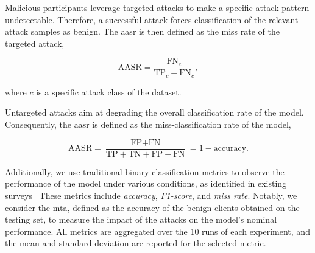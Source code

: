 \begin{description}[font=\normalfont\textit]
  \item[Targeted attacks:]
    Malicious participants leverage targeted attacks to make a specific attack pattern undetectable.
    Therefore, a successful attack forces classification of the relevant attack samples as benign.
    The \gls{aasr} is then defined as the miss rate of the targeted attack, \ie

    \begin{equation}
      \label{eq:aasr_targeted}
      \text{AASR} = \frac
        {\text{FN}_c}
        {\text{TP}_c + \text{FN}_c},
    \end{equation}

    where $c$ is a specific attack class of the dataset.

  \item[Untargeted Attacks:]
    Untargeted attacks aim at degrading the overall classification rate of the model.
    Consequently, the \gls{aasr} is defined as the miss-classification rate of the model, \ie

    \begin{equation}
      \label{eq:aasr_untargeted}
      \text{AASR} = \frac
        {\text{FP} + \text{FN}}
        {\text{TP} + \text{TN} + \text{FP} + \text{FN}}
        = 1 - \text{accuracy}.
    \end{equation}
\end{description}

Additionally, we use traditional binary classification metrics to observe the performance of the model under various conditions, as identified in existing surveys~\cite{campos_EvaluatingFederatedLearning_2022,lavaur_EvolutionFederatedLearningbased_2022}
These metrics include \emph{accuracy}, \emph{F1-score}, and \emph{miss rate}.
Notably, we consider the \gls{mta}, defined as the accuracy of the benign clients obtained on the testing set, to measure the impact of the attacks on the model's nominal performance.
All metrics are aggregated over the 10 runs of each experiment, and the mean and standard deviation are reported for the selected metric.